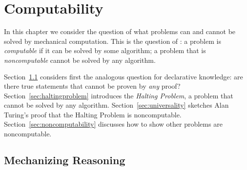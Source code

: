 \chapter{Computability}\label{ch:computability}\label{ch:universal}
\begin{schemeregion}



In this chapter we consider the question of what problems can and cannot be solved by mechanical computation.  This is the question of : a problem is \emph{computable} if it can be solved by some algorithm; a problem that is \emph{noncomputable} cannot be solved by any algorithm.

Section~\ref{sec:mechanized-reasoning} considers first the analogous question for declarative knowledge: are there true statements that cannot be proven by \emph{any} proof? Section~\ref{sec:haltingproblem} introduces the \emph{Halting Problem}, a problem that cannot be solved by any algorithm.  Section~\ref{sec:universality} sketches Alan Turing's proof that the Halting Problem is noncomputable.  Section~\ref{sec:noncomputability} discusses how to show other problems are noncomputable.

\section{Mechanizing Reasoning}\label{sec:mechanized-reasoning}


\end{schemeregion}
